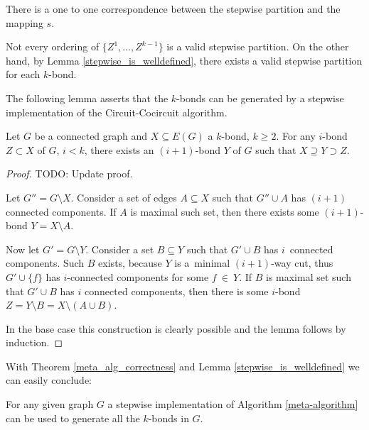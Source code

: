 \begin{rem}
	There is a one to one correspondence between the stepwise partition and the mapping $s$.
\end{rem}

\begin{rem}
	Not every ordering of $\{Z^1, \ldots, Z^{k-1}\}$ is a valid stepwise partition. On the other hand, by Lemma \ref{stepwise_is_welldefined}, there exists a valid stepwise partition for each $k$-bond.
\end{rem}

The following lemma asserts that the $k$-bonds can be generated by a stepwise implementation of the Circuit-Cocircuit algorithm.

\begin{lem}
	\label{stepwise_is_welldefined}
	Let $G$ be a connected graph and $X \subseteq E(G)$ a $k$-bond, $k \geq 2$.
	For any $i$-bond $Z \subset X$ of $G$, $i < k$, there exists an $(i+1)$-bond $Y$ of $G$ such that $X \supseteq Y \supset Z$.
\end{lem}

\begin{proof}
	TODO: Update proof.

	Let $G'' = G \setminus X$. Consider a set of edges $A \subseteq X$ such that $G'' \cup A$ has $(i+1)$ connected components. If $A$ is maximal such set, then there exists some $(i+1)$-bond $Y = X \setminus A$.

	Now let $G' = G \setminus Y$. Consider a set $B \subseteq Y$ such that $G' \cup B$ has $i$~connected components. Such $B$ exists, because $Y$ is a~minimal $(i+1)$-way cut, thus $G' \cup \{f\}$ has $i$-connected components for some $f~\in~Y$. If $B$ is maximal set such that $G' \cup B$ has $i$ connected components, then there is some $i$-bond $Z = Y \setminus B = X \setminus (A \cup B)$.

	In the base case this construction is clearly possible and the \linebreak lemma follows by induction.
\end{proof}

With Theorem \ref{meta_alg_correctness} and Lemma \ref{stepwise_is_welldefined} we can easily conclude:

\begin{thm}
	\label{thm:stepwise_impl_correctness}
	For any given graph $G$ a stepwise implementation of Algorithm \ref{meta-algorithm} can be used to generate all the $k$-bonds in $G$.
\end{thm}


